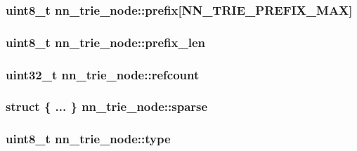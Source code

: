 \subsubsection[{prefix}]{\setlength{\rightskip}{0pt plus 5cm}uint8\+\_\+t nn\+\_\+trie\+\_\+node\+::prefix\mbox{[}{\bf N\+N\+\_\+\+T\+R\+I\+E\+\_\+\+P\+R\+E\+F\+I\+X\+\_\+\+M\+AX}\mbox{]}}\hypertarget{structnn__trie__node_a7aefc668cabcbce6cad09c5e77637d31}{}\label{structnn__trie__node_a7aefc668cabcbce6cad09c5e77637d31}
\subsubsection[{prefix\+\_\+len}]{\setlength{\rightskip}{0pt plus 5cm}uint8\+\_\+t nn\+\_\+trie\+\_\+node\+::prefix\+\_\+len}\hypertarget{structnn__trie__node_a15bfe2d362609805b0a38881413347e9}{}\label{structnn__trie__node_a15bfe2d362609805b0a38881413347e9}
\subsubsection[{refcount}]{\setlength{\rightskip}{0pt plus 5cm}uint32\+\_\+t nn\+\_\+trie\+\_\+node\+::refcount}\hypertarget{structnn__trie__node_a6dc1089a8be3d504fab316eb5c550ac8}{}\label{structnn__trie__node_a6dc1089a8be3d504fab316eb5c550ac8}
\subsubsection[{sparse}]{\setlength{\rightskip}{0pt plus 5cm}struct \{ ... \}   nn\+\_\+trie\+\_\+node\+::sparse}\hypertarget{structnn__trie__node_ae430bf1862fd92f30bd991647645fc05}{}\label{structnn__trie__node_ae430bf1862fd92f30bd991647645fc05}
\subsubsection[{type}]{\setlength{\rightskip}{0pt plus 5cm}uint8\+\_\+t nn\+\_\+trie\+\_\+node\+::type}\hypertarget{structnn__trie__node_a1ad8cbb3a89780ea9958b48ecc0a2f45}{}\label{structnn__trie__node_a1ad8cbb3a89780ea9958b48ecc0a2f45}
